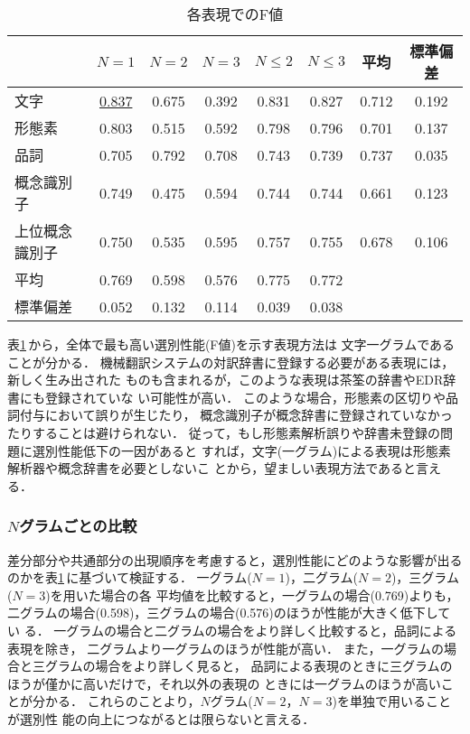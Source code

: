 \begin{table}[htbp]
\caption{各表現でのF値}
\label{tab:fvalue}
\begin{center}
\begin{tabular}{|l|c|c|c|c|c|c|c|}\hline
& $N = 1$ & $N = 2$ & $N = 3$ & $N \le 2$ & $N \le 3$ & 平均 & 標準偏差 \\\hline
文字           & \underline{0.837} & 0.675 & 0.392 & 0.831 & 0.827 & 0.712 & 0.192 \\
形態素         & 0.803 & 0.515 & 0.592 & 0.798 & 0.796 & 0.701 & 0.137 \\
品詞           & 0.705 & 0.792 & 0.708 & 0.743 & 0.739 & 0.737 & 0.035 \\
概念識別子     & 0.749 & 0.475 & 0.594 & 0.744 & 0.744 & 0.661 & 0.123 \\
上位概念識別子 & 0.750 & 0.535 & 0.595 & 0.757 & 0.755 & 0.678 & 0.106 \\\hline
平均           & 0.769 & 0.598 & 0.576 & 0.775 & 0.772 & \multicolumn{1}{|c}{} & \\
標準偏差       & 0.052 & 0.132 & 0.114 & 0.039 & 0.038 & \multicolumn{1}{|c}{} & \\\hline
\end{tabular}
\end{center}
\end{table}

表\ref{tab:fvalue}\,から，全体で最も高い選別性能(F値)を示す表現方法は
文字一グラムであることが分かる．
機械翻訳システムの対訳辞書に登録する必要がある表現には，新しく生み出された
ものも含まれるが，このような表現は茶筌の辞書やEDR辞書にも登録されていな
い可能性が高い．
このような場合，形態素の区切りや品詞付与において誤りが生じたり，
概念識別子が概念辞書に登録されていなかったりすることは避けられない． 
従って，もし形態素解析誤りや辞書未登録の問題に選別性能低下の一因があると
すれば，文字(一グラム)による表現は形態素解析器や概念辞書を必要としないこ
とから，望ましい表現方法であると言える．


\subsubsection{$N$グラムごとの比較}

差分部分や共通部分の出現順序を考慮すると，選別性能にどのような影響が出る
のかを表\ref{tab:fvalue}\,に基づいて検証する．
一グラム($N = 1$)，二グラム($N = 2$)，三グラム($N = 3$)を用いた場合の各
平均値を比較すると，一グラムの場合(0.769)よりも，
二グラムの場合(0.598)，三グラムの場合(0.576)のほうが性能が大きく低下してい
る．
一グラムの場合と二グラムの場合をより詳しく比較すると，品詞による表現を除き，
二グラムより一グラムのほうが性能が高い． 
また，一グラムの場合と三グラムの場合をより詳しく見ると，
品詞による表現のときに三グラムのほうが僅かに高いだけで，それ以外の表現の
ときには一グラムのほうが高いことが分かる．
これらのことより，$N$グラム($N = 2$，$N = 3$)を単独で用いることが選別性
能の向上につながるとは限らないと言える．

